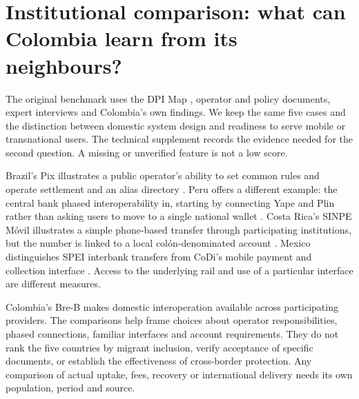 \section{Institutional comparison: what can Colombia learn from its neighbours?}
The original benchmark uses the DPI Map \citep{institute_for_innovation_and_public_purpose_ucl_dpi_2025}, operator and policy documents, expert interviews and Colombia's own findings. We keep the same five cases and the distinction between domestic system design and readiness to serve mobile or transnational users. The technical supplement records the evidence needed for the second question. A missing or unverified feature is not a low score.

Brazil's Pix illustrates a public operator's ability to set common rules and operate settlement and an alias directory \citep{bcbpix}. Peru offers a different example: the central bank phased interoperability in, starting by connecting Yape and Plin rather than asking users to move to a single national wallet \citep{bcrp2025}. Costa Rica's SINPE Móvil illustrates a simple phone-based transfer through participating institutions, but the number is linked to a local colón-denominated account \citep{bccrsinpe}. Mexico distinguishes SPEI interbank transfers from CoDi's mobile payment and collection interface \citep{banxicocodi,banxicospei}. Access to the underlying rail and use of a particular interface are different measures.

Colombia's Bre-B makes domestic interoperation available across participating providers. The comparisons help frame choices about operator responsibilities, phased connections, familiar interfaces and account requirements. They do not rank the five countries by migrant inclusion, verify acceptance of specific documents, or establish the effectiveness of cross-border protection. Any comparison of actual uptake, fees, recovery or international delivery needs its own population, period and source.
